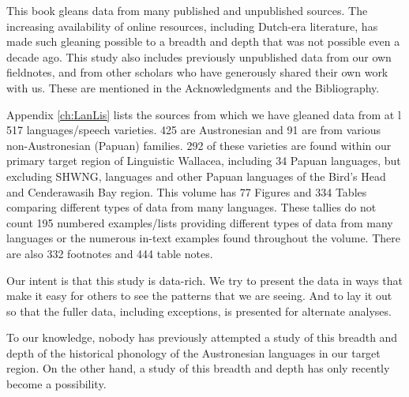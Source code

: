 This book gleans data from many published
and unpublished sources.
The increasing availability of online resources,
including Dutch-era literature,
has made such gleaning possible to a breadth
and depth that was not possible even a decade ago.
This study also includes previously unpublished data from our own fieldnotes,
and from other scholars who have generously shared their own work with us.
These are mentioned in the Acknowledgments
and the Bibliography.

Appendix \ref{ch:LanLis} lists the sources from which we have gleaned
data from at l 517 languages/speech varieties.
425 are Austronesian
and 91 are from various non-Austronesian (Papuan) families.
292 of these varieties are found within our
primary target region of Linguistic Wallacea,
including 34 Papuan  languages,
but excluding SHWNG,
 languages
and other Papuan languages of the Bird’s Head
and Cenderawasih Bay region.
This volume has 77 Figures
and 334 Tables comparing different types of data from many languages.
These tallies do not count 195 numbered examples/lists
providing different types of data from many
languages or the numerous in-text examples found throughout the volume.
There are also 332 footnotes
and 444 table notes.

Our intent is that this study is data-rich.
We try to present the data in ways that make it easy for others to see the patterns that we are seeing.
And to lay it out so that the fuller data,
including exceptions, is presented for alternate analyses.

To our knowledge,
nobody has previously attempted a study of this breadth
and depth of the historical phonology of the Austronesian languages in our target region.
On the other hand,
a study of this breadth
and depth has only recently become a possibility.